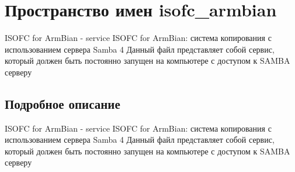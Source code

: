 \hypertarget{namespaceisofc__armbian}{}\section{Пространство имен isofc\+\_\+armbian}
\label{namespaceisofc__armbian}


I\+S\+O\+FC for Arm\+Bian -\/ service I\+S\+O\+FC for Arm\+Bian\+: система копирования с использованием сервера Samba 4 Данный файл представляет собой сервис, который должен быть постоянно запущен на компьютере с доступом к S\+A\+M\+BA серверу  




\subsection{Подробное описание}
I\+S\+O\+FC for Arm\+Bian -\/ service I\+S\+O\+FC for Arm\+Bian\+: система копирования с использованием сервера Samba 4 Данный файл представляет собой сервис, который должен быть постоянно запущен на компьютере с доступом к S\+A\+M\+BA серверу 